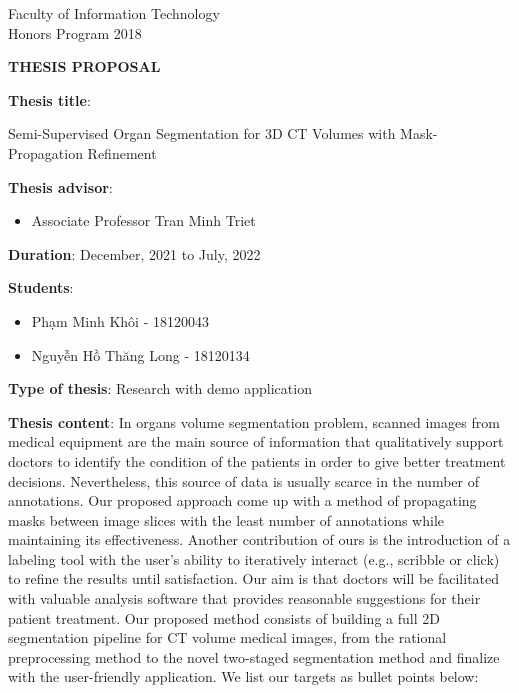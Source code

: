 \documentclass[12pt]{article}
\begin{document}
Faculty of Information Technology\\
Honors Program 2018\\
 
\begin{center}
\textbf{\Large THESIS PROPOSAL}
\end{center}

 
\textbf{Thesis title}: \par
Semi-Supervised Organ Segmentation for 3D CT Volumes with Mask-Propagation Refinement

\textbf{Thesis advisor}:
\begin{itemize}
    \item Associate Professor Tran Minh Triet
\end{itemize}

\textbf{Duration}: December, 2021 to July, 2022

\textbf{Students}:
\begin{itemize}
    \item Phạm Minh Khôi - 18120043
    \item Nguyễn Hồ Thăng Long - 18120134
\end{itemize}

\textbf{Type of thesis}: Research with demo application

\textbf{Thesis content}: In organs volume segmentation problem, scanned images from medical equipment are the main source of information that qualitatively support doctors to identify the condition of the patients in order to give better treatment decisions. Nevertheless, this source of data is usually scarce in the number of annotations. Our proposed approach come up with a method of propagating masks between image slices with the least number of annotations while maintaining its effectiveness. Another contribution of ours is the introduction of a labeling tool with the user’s ability to iteratively interact (e.g., scribble or click) to refine the results until satisfaction. Our aim is that doctors will be facilitated with valuable analysis software that provides reasonable suggestions for their patient treatment.
Our proposed method consists of building a full 2D segmentation pipeline for CT volume medical images, from the rational preprocessing method to the novel two-staged segmentation method and finalize with the user-friendly application.  We list our targets as bullet points below:
\end{document}
